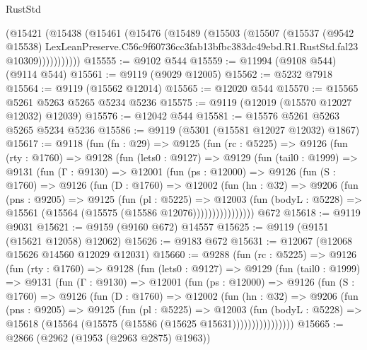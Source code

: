 \begin{lexlean}{RustStd}
\begin{coremodule}
          (@15421
            (@15438
              (@15461
                (@15476
                  (@15489
                    (@15503
                      (@15507
                        (@15537
                          (@9542 @15538)
                          LexLeanPreserve.C56c9f60736cc3fab13bfbc383dc49ebd.R1.RustStd.fal23
                          @10309)))))))))))
@15555 := @9102 @544
@15559 := @11994 (@9108 @544) (@9114 @544)
@15561 := @9119 (@9029 @12005)
@15562 := @5232 @7918
@15564 := @9119 (@15562 @12014)
@15565 := @12020 @544
@15570 := @15565 @5261 @5263 @5265 @5234 @5236
@15575 := @9119 (@12019 (@15570 @12027 @12032) @12039)
@15576 := @12042 @544
@15581 := @15576 @5261 @5263 @5265 @5234 @5236
@15586 := @9119 (@5301 (@15581 @12027 @12032) @1867)
@15617 := @9118
    (fun (fn : @29) =>
    @9125
      (fun (rc : @5225) =>
      @9126
        (fun (rty : @1760) =>
        @9128
          (fun (lets0 : @9127) =>
          @9129
            (fun (tail0 : @1999) =>
            @9131
              (fun (Γ : @9130) =>
              @12001
                (fun (ps : @12000) =>
                @9126
                  (fun (S : @1760) =>
                  @9126
                    (fun (D : @1760) =>
                    @12002
                      (fun (hn : @32) =>
                      @9206
                        (fun (pns : @9205) =>
                        @9125
                          (fun (pl : @5225) =>
                          @12003
                            (fun (bodyL : @5228) =>
                            @15561 (@15564 (@15575 (@15586 @12076))))))))))))))))
    @672
@15618 := @9119 @9031
@15621 := @9159 (@9160 @672) @14557
@15625 := @9119 (@9151 (@15621 @12058) @12062)
@15626 := @9183 @672
@15631 := @12067 (@12068 @15626 @14560 @12029 @12031)
@15660 := @9288
    (fun (rc : @5225) =>
    @9126
      (fun (rty : @1760) =>
      @9128
        (fun (lets0 : @9127) =>
        @9129
          (fun (tail0 : @1999) =>
          @9131
            (fun (Γ : @9130) =>
            @12001
              (fun (ps : @12000) =>
              @9126
                (fun (S : @1760) =>
                @9126
                  (fun (D : @1760) =>
                  @12002
                    (fun (hn : @32) =>
                    @9206
                      (fun (pns : @9205) =>
                      @9125
                        (fun (pl : @5225) =>
                        @12003
                          (fun (bodyL : @5228) =>
                          @15618 (@15564 (@15575 (@15586 (@15625 @15631))))))))))))))))
@15665 := @2866 (@2962 (@1953 (@2963 @2875) @1963))

\end{coremodule}
\end{lexlean}
